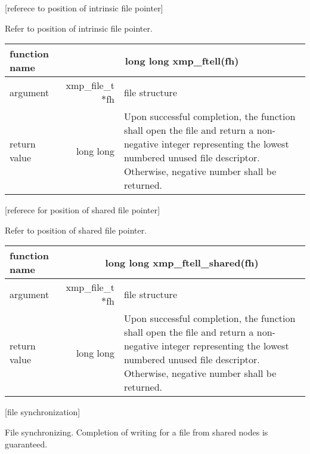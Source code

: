    [referece to position of intrinsic file pointer]

   Refer to position of intrinsic file pointer.
   \begin{table}[h]
    \begin{center}
     \begin{tabular}{|l|r|p{80mm}|}
      \hline
      {\bf function name}  & \multicolumn{2}{c|}{\bf long long
      xmp\_ftell(fh)} \\ \hline \hline
      argument & xmp\_file\_t $*$fh & file structure \\ \hline
      return value & long long & Upon successful completion, the
	      function shall open the file and return a non-negative
	      integer representing the lowest numbered unused file
	      descriptor. Otherwise, negative number shall be
	      returned. \\ \hline
      \end{tabular}
     \end{center}
    \label{tb:aaa}
   \end{table}
   

   
   [referece for position of shared file pointer]

   Refer to position of shared file pointer.
   \begin{table}[h]
    \begin{center}
     \begin{tabular}{|l|r|p{80mm}|}
      \hline
      {\bf function name}  & \multicolumn{2}{c|}{\bf long long
      xmp\_ftell\_shared(fh)} \\ \hline \hline
      argument & xmp\_file\_t $*$fh & file structure \\ \hline
      return value & long long & Upon successful completion, the
	      function shall open the file and return a non-negative
	      integer representing the lowest numbered unused file
	      descriptor. Otherwise, negative number shall be
	      returned. \\ \hline
      \end{tabular}
     \end{center}
    \label{tb:aaa}
   \end{table}
   
   

   [file synchronization]

   File synchronizing.
   Completion of writing for a file from shared nodes is guaranteed.

